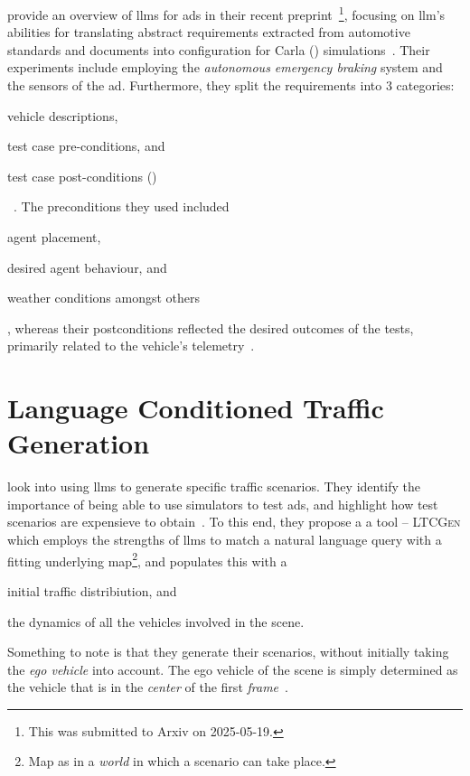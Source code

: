 \citeauthor{requirementsAllYouNeed} provide an overview of \acrshort{llms} for \acrshort{ads} in
their recent preprint~\footnote{This was submitted to Arxiv on
    2025-05-19.}, focusing on \acrshort{llm}'s abilities for translating abstract requirements extracted
from automotive standards and documents into configuration for Carla ()
simulations~\cite{requirementsAllYouNeed}. Their experiments include employing the
\textit{autonomous emergency braking} system and the sensors of the \acrshort{ad}. Furthermore, they
split the requirements into \num{3} categories: \begin{inparaenum}
    \item vehicle descriptions,
    \item test case pre-conditions, and
    \item test case post-conditions ()
\end{inparaenum}~\cite{requirementsAllYouNeed}. The preconditions they used included
\begin{inparaenum}
    \item agent placement,
    \item desired agent behaviour, and
    \item weather conditions amongst others\end{inparaenum}, whereas their postconditions reflected
the desired outcomes of the tests, primarily related to the vehicle's
telemetry~\cite{requirementsAllYouNeed}.

\section{Language Conditioned Traffic Generation}

\citeauthor{languageconditionedtrafficgeneration} look into using \acrshort{llms} to generate
specific traffic scenarios. They identify the importance of being able to use simulators to test
\acrshort{ads}, and highlight how test scenarios are expensieve to
obtain~\cite[1]{languageconditionedtrafficgeneration}. To this end, they propose a a tool --
\textsc{LTCGen} which employs the strengths of \acrshort{llms} to match a natural language query
with a fitting underlying map\footnote{Map as in a \textit{world} in which a scenario can take
    place.}, and populates this with a \begin{inparaenum}
    \item initial traffic distribiution, and
    \item the dynamics of all the vehicles involved in the scene.
\end{inparaenum}
Something to note is that they generate their scenarios, without initially taking the \textit{ego
    vehicle} into account. The ego vehicle of the scene is simply determined as the vehicle that is
in the \textit{center} of the first
\textit{frame}~\cite[3]{languageconditionedtrafficgeneration}.